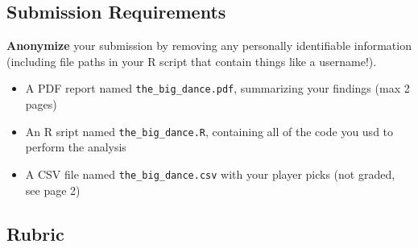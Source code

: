 \documentclass{article}
\begin{document}
      \subsection*{\sc Submission Requirements}
      
        {\bf Anonymize} your submission by removing any personally identifiable information (including file paths in your R script that contain things like a username!).
        \begin{itemize}
          \item A PDF report named \texttt{the\_big\_dance.pdf}, summarizing your findings (max 2 pages)
          \item An R sript named \texttt{the\_big\_dance.R}, containing all of the code you usd to perform the analysis
          \item A CSV file named \texttt{the\_big\_dance.csv} with your player picks (not graded, see page 2)
        \end{itemize}

      \subsection*{\sc Rubric}
\end{document}

